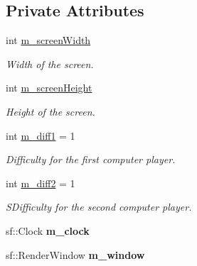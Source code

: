 \subsection*{Private Attributes}
\begin{DoxyCompactItemize}
\item 
int \hyperlink{classGame_a3ca6211d0b7381af054371cd1224138b}{m\+\_\+screen\+Width}\hypertarget{classGame_a3ca6211d0b7381af054371cd1224138b}{}\label{classGame_a3ca6211d0b7381af054371cd1224138b}

\begin{DoxyCompactList}\small\item\em Width of the screen. \end{DoxyCompactList}\item 
int \hyperlink{classGame_ae93049873fcfc4f80d900ca3fc85aa26}{m\+\_\+screen\+Height}\hypertarget{classGame_ae93049873fcfc4f80d900ca3fc85aa26}{}\label{classGame_ae93049873fcfc4f80d900ca3fc85aa26}

\begin{DoxyCompactList}\small\item\em Height of the screen. \end{DoxyCompactList}\item 
int \hyperlink{classGame_aaf163095ccfc91879e0309470f03770e}{m\+\_\+diff1} = 1\hypertarget{classGame_aaf163095ccfc91879e0309470f03770e}{}\label{classGame_aaf163095ccfc91879e0309470f03770e}

\begin{DoxyCompactList}\small\item\em Difficulty for the first computer player. \end{DoxyCompactList}\item 
int \hyperlink{classGame_a5de23d361fa26310392bfb0cd5bed724}{m\+\_\+diff2} = 1\hypertarget{classGame_a5de23d361fa26310392bfb0cd5bed724}{}\label{classGame_a5de23d361fa26310392bfb0cd5bed724}

\begin{DoxyCompactList}\small\item\em S\+Difficulty for the second computer player. \end{DoxyCompactList}\item 
sf\+::\+Clock {\bfseries m\+\_\+clock}\hypertarget{classGame_afa2b2cd71f1808971458e67a8540a83d}{}\label{classGame_afa2b2cd71f1808971458e67a8540a83d}

\item 
sf\+::\+Render\+Window {\bfseries m\+\_\+window}\hypertarget{classGame_a22a61b5ea27c609be8cf2724c33d7ae5}{}\label{classGame_a22a61b5ea27c609be8cf2724c33d7ae5}


\end{DoxyCompactItemize}
